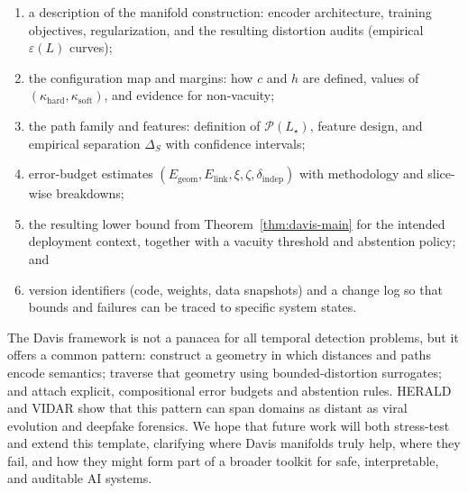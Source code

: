 \documentclass[11pt]{article}
\theoremstyle{remark}
\theoremstyle{plain}
\begin{document}
\begin{enumerate}[label=(D\arabic*),leftmargin=1.7em,itemsep=2pt,topsep=2pt]
  \item a description of the manifold construction: encoder architecture, training objectives,
        regularization, and the resulting distortion audits (empirical $\varepsilon(L)$ curves);
  \item the configuration map and margins: how $c$ and $h$ are defined, values of
        $(\kappa_{\mathrm{hard}},\kappa_{\mathrm{soft}})$, and evidence for non-vacuity;
  \item the path family and features: definition of $\mathcal{P}(L_\star)$, feature design, and empirical
        separation $\Delta_S$ with confidence intervals;
  \item error-budget estimates $(E_{\mathrm{geom}},E_{\mathrm{link}},\xi,\zeta,\delta_{\mathrm{indep}})$ with
        methodology and slice-wise breakdowns;
  \item the resulting lower bound from Theorem~\ref{thm:davis-main} for the intended deployment
        context, together with a vacuity threshold and abstention policy; and
  \item version identifiers (code, weights, data snapshots) and a change log so that bounds and
        failures can be traced to specific system states.
\end{enumerate}

\medskip
The Davis framework is not a panacea for all temporal detection problems, but it offers a common
pattern: construct a geometry in which distances and paths encode semantics; traverse that geometry
using bounded-distortion surrogates; and attach explicit, compositional error budgets and abstention
rules. HERALD and VIDAR show that this pattern can span domains as distant as viral evolution and
deepfake forensics. We hope that future work will both stress-test and extend this template, clarifying
where Davis manifolds truly help, where they fail, and how they might form part of a broader toolkit
for safe, interpretable, and auditable AI systems.

\end{document}

